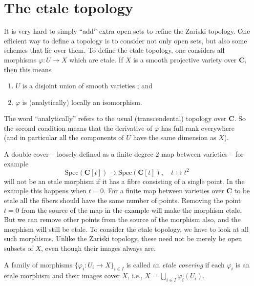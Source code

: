 \section{The etale topology}
\label{section-etale-topology}

\noindent
It is very hard to simply ``add'' extra open sets to refine the Zariski
topology. One efficient way to define a topology is to consider not only open
sets, but also some schemes that lie over them. To define the etale topology,
one considers all morphisms $\varphi: U \to X$ which are etale. If
$X$ is a smooth projective variety over $\mathbf{C}$, then this means
\begin{enumerate}
\item $U$ is a disjoint union of smooth varieties ; and
\item $\varphi$ is (analytically) locally an isomorphism.
\end{enumerate}
The word ``analytically'' refers to the usual (transcendental) topology over
$\mathbf{C}$. So the second condition means that the derivative of $\varphi$
has full rank everywhere (and in particular all the components of $U$
have the same dimension as $X$).

\medskip\noindent
A double cover -- loosely defined as a finite degree $2$ map between varieties
-- for example
$$
\text{Spec}(\mathbf{C}[t])
\longrightarrow
\text{Spec}(\mathbf{C}[t]),
\quad t \longmapsto t^2
$$
will not be an etale morphism if it has a fibre consisting of a single point.
In the example this happens when $t = 0$. For a finite map between varieties
over $\mathbf{C}$ to be etale all the fibers should have the same number of
points. Removing the point $t = 0$ from the source of the map in the example
will make the morphism etale. But we can remove other points from the source
of the morphism also, and the morphism will still be etale.  To consider the
etale topology, we have to look at all such morphisms. Unlike the Zariski
topology, these need not be merely be open subsets of $X$, even though their
images always are.

\begin{definition}
\label{definition-etale-covering-initial}
A family of morphisms $\{ \varphi_i : U_i \to X\}_{i \in I}$ is
called an {\it etale covering} if each $\varphi_i$ is an etale morphism
and their images cover $X$, i.e.,
$X = \bigcup_{i \in I} \varphi_i(U_i)$.
\end{definition}

